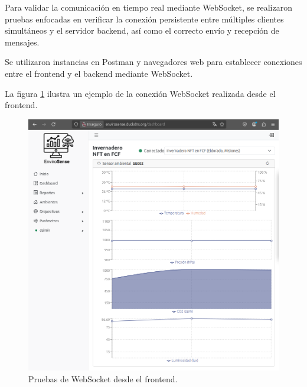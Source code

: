 Para validar la comunicación en tiempo real mediante WebSocket, se realizaron
pruebas enfocadas en verificar la conexión persistente entre múltiples clientes
simultáneos y el servidor backend, así como el correcto envío y recepción de
mensajes.

Se utilizaron instancias en Postman y navegadores web para establecer
conexiones entre el frontend y el backend mediante WebSocket.




La figura \ref{fig:websocket_1} ilustra un ejemplo de la conexión WebSocket
realizada desde el frontend.

\begin{figure}[H]
    \centering
    \includegraphics[width=\textwidth]{Images/39_websocket_1.png}
    \caption[Pruebas de WebSocket en frontend]{Pruebas de WebSocket desde el frontend.}
    \label{fig:websocket_1}
\end{figure}

